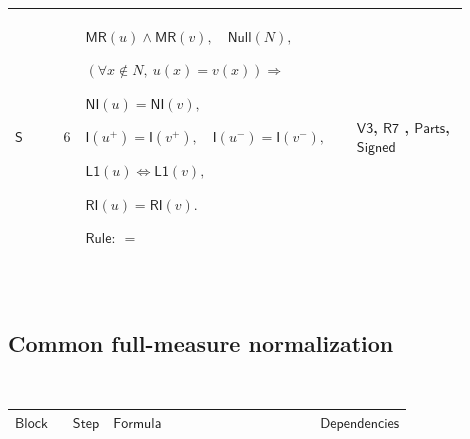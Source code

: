 \documentclass[12pt,reqno]{amsart}
\theoremstyle{blueplain}
\numberwithin{equation}{section}
\newlength{\DCTOneColumnBody}
\begin{document}
{\scriptsize \setlength{\parskip}{0pt}\nointerlineskip
\noindent 
\begin{tabular}{|@{}>{\centering\arraybackslash}m{0.10658\linewidth}|>{\centering\arraybackslash}m{0.03553\linewidth}|>{\centering\arraybackslash}m{0.52105\linewidth}|>{\centering\arraybackslash}m{0.23684\linewidth}|}
\hline
\hypertarget{dct:S6}{$\displaystyle \mathsf{S}$} & $\displaystyle 6$ & $%
\displaystyle \mathsf{MR}(u)\land\mathsf{MR}(v),\quad\mathsf{Null}(N),$\par$%
\displaystyle (\forall x\notin N,\ u(x)=v(x))\Rightarrow$\par$\displaystyle 
\mathsf{NI}(u)=\mathsf{NI}(v),$\par$\displaystyle \mathsf{I}(u^+)=\mathsf{I}%
(v^+),\quad\mathsf{I}(u^-)=\mathsf{I}(v^-),$\par$\displaystyle \mathsf{L1}%
(u)\Longleftrightarrow\mathsf{L1}(v),$\par$\displaystyle \mathsf{RI}(u)=%
\mathsf{RI}(v).$\par$\displaystyle \mathsf{Rule}:\ =$ & \hyperlink{dct:V3}{$%
\displaystyle \mathsf{V3}$}, \hyperlink{dct:R7}{$\displaystyle \mathsf{R7}$}%
, \hyperlink{dctdef:Parts}{$\displaystyle \mathsf{Parts}$}, \hyperlink{dctdef:Signed}%
{$\displaystyle \mathsf{Signed}$} \\ \hline
\end{tabular}%
}

{\scriptsize \ }

\subsection{\protect\scriptsize Common full-measure normalization}

{\scriptsize {\ }}

{\scriptsize \setlength{\parskip}{0pt}\nointerlineskip
\noindent 
\begin{tabular}{|@{}>{\centering\arraybackslash}m{\DCTOneColumnBody}|}
\hline
$\displaystyle \mathsf{CommonFullMeasureSet}$ \\ \hline
\end{tabular}%
}

{\scriptsize \setlength{\parskip}{0pt}\nointerlineskip
\noindent 
\begin{tabular}{|@{}>{\centering\arraybackslash}m{0.10658\linewidth}|>{\centering\arraybackslash}m{0.03553\linewidth}|>{\centering\arraybackslash}m{0.52105\linewidth}|>{\centering\arraybackslash}m{0.23684\linewidth}|}
\hline
$\displaystyle \mathsf{Block}$ & $\displaystyle \mathsf{Step}$ & $%
\displaystyle \mathsf{Formula}$ & $\displaystyle \mathsf{Dependencies}$ \\ 
\hline
\end{tabular}%
}
\end{document}
